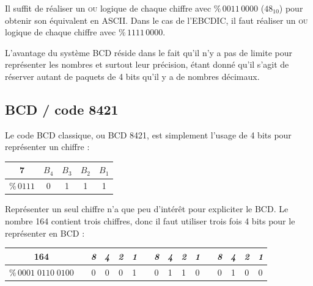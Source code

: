 \documentclass[11pt,a4paper]{article}
\begin{document}
Il suffit de réaliser un \textsc{ou} logique de chaque chiffre avec $ \text{\%} \, 0011 \, 0000 $ ($48_{10}$) pour obtenir son équivalent en ASCII.
Dans le cas de l'EBCDIC, il faut réaliser un \textsc{ou} logique de chaque chiffre avec $ \text{\%} \, 1111 \, 0000 $.

\bigskip

L'avantage du système BCD réside dans le fait qu'il n'y a pas de limite pour représenter les nombres et surtout leur précision, étant donné qu'il s'agit de réserver autant de paquets de 4 bits qu'il y a de nombres décimaux.


\bigskip


\subsection{BCD / code 8421}

\bigskip

Le code BCD classique, ou BCD 8421, est simplement l'usage de 4 bits pour représenter un chiffre :

\bigskip

\begin{center}
\begin{tabular}{ c  | c | c | c | c | }
7                 & $B_{4}$ & $B_{3}$ & $B_{2}$ & $B_{1}$ \\
\hline
$ \text{\%} \, 0111 $ & 0 & 1 & 1 & 1 \\
\end{tabular}
\end{center}

\bigskip

Représenter un seul chiffre n'a que peu d'intérêt pour expliciter le BCD.
Le nombre 164 contient trois chiffres, donc il faut utiliser trois fois 4 bits pour le représenter en BCD :

\bigskip

\begin{center}
\begin{tabular}{ c | m{0.25cm} | c | c | c | c | m{0.25cm} | c | c | c | c | m{0.25cm} | c | c | c | c | }
164 & \cellcolor{black!15} & \textit{8} & \textit{4} & \textit{2} & \textit{1} & \cellcolor{black!15} & \textit{8} & \textit{4} & \textit{2} & \textit{1} & \cellcolor{black!15} & \textit{8} & \textit{4} & \textit{2} & \textit{1} \\
\hline
$ \text{\%} \, 0001 \; 0110 \; 0100 $ & \cellcolor{black!15} & 0 & 0 & 0 & 1 & \cellcolor{black!15} & 0 & 1 & 1 & 0 & \cellcolor{black!15} & 0 & 1 & 0 & 0 \\
\end{tabular}
\end{center}
\end{document}

